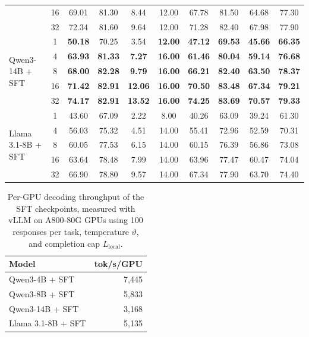 \begin{table}[H]
\begin{tabular}{lccccccccc}
 & 16 & 69.01 & 81.30 & 8.44 & 12.00 & 67.78 & 81.50 & 64.68 & 77.30 \\
 & 32 & 72.34 & 81.60 & 9.64 & 12.00 & 71.28 & 82.40 & 67.98 & 77.90 \\
\cmidrule(l{3pt}r{3pt}){1-10}
\multirow{5}{*}{Qwen3-14B + SFT}
 & 1  & \textbf{50.18} & 70.25 & 3.54 & \textbf{12.00} & \textbf{47.12} & \textbf{69.53} & \textbf{45.66} & \textbf{66.35} \\
 & 4  & \textbf{63.93} & \textbf{81.33} & \textbf{7.27} & \textbf{16.00} & \textbf{61.46} & \textbf{80.04} & \textbf{59.14} & \textbf{76.68} \\
 & 8  & \textbf{68.00} & \textbf{82.28} & \textbf{9.79} & \textbf{16.00} & \textbf{66.21} & \textbf{82.40} & \textbf{63.50} & \textbf{78.37} \\
 & 16 & \textbf{71.42} & \textbf{82.91} & \textbf{12.06} & \textbf{16.00} & \textbf{70.50} & \textbf{83.48} & \textbf{67.34} & \textbf{79.21} \\
 & 32 & \textbf{74.17} & \textbf{82.91} & \textbf{13.52} & \textbf{16.00} & \textbf{74.25} & \textbf{83.69} & \textbf{70.57} & \textbf{79.33} \\
\cmidrule(l{3pt}r{3pt}){1-10}
\multirow{5}{*}{Llama 3.1-8B + SFT}
 & 1  & 43.60 & 67.09 & 2.22 & 8.00  & 40.26 & 63.09 & 39.24 & 61.30 \\
 & 4  & 56.03 & 75.32 & 4.51 & 14.00 & 55.41 & 72.96 & 52.59 & 70.31 \\
 & 8  & 60.05 & 77.53 & 6.15 & 14.00 & 60.15 & 76.39 & 56.86 & 73.08 \\
 & 16 & 63.64 & 78.48 & 7.99 & 14.00 & 63.96 & 77.47 & 60.47 & 74.04 \\
 & 32 & 66.90 & 78.80 & 9.57 & 14.00 & 67.34 & 77.90 & 63.70 & 74.40 \\
\bottomrule
\end{tabular}
\end{table}
\begin{table}[H]
\centering
\setlength{\tabcolsep}{5pt}
\caption{Per-GPU decoding throughput of the SFT checkpoints, measured with
vLLM on A800-80G GPUs using 100 responses per task,
temperature \(\vartheta\), and completion cap \(L_{\mathrm{local}}\).}
\label{tab:sft-serving}
\begin{tabular}{lr}
\toprule
\rowcolor{algobg}
Model & tok/s/GPU \\
\midrule
Qwen3-4B + SFT & 7,445 \\
Qwen3-8B + SFT & 5,833 \\
Qwen3-14B + SFT & 3,168 \\
Llama 3.1-8B + SFT & 5,135 \\
\bottomrule
\end{tabular}
\end{table}

